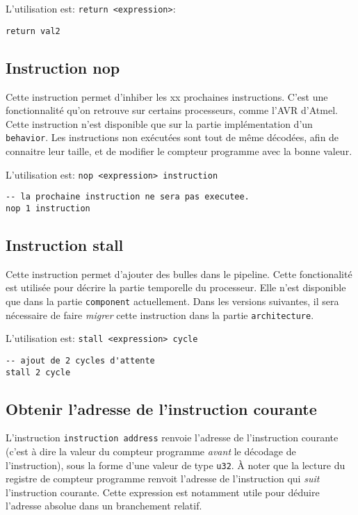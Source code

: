 L'utilisation est: \texttt{return <expression>}:
\begin{lstlisting}
return val2
\end{lstlisting}

\subsection{Instruction nop}
Cette instruction permet d'inhiber les xx prochaines instructions. C'est une fonctionnalité qu'on retrouve sur certains processeurs, comme l'AVR d'Atmel. Cette instruction n'est disponible que sur la partie implémentation d'un \texttt{behavior}. Les instructions non exécutées sont tout de même décodées, afin de connaitre leur taille, et de modifier le compteur programme avec la bonne valeur.

L'utilisation est: \texttt{nop <expression> instruction}
\begin{lstlisting}
-- la prochaine instruction ne sera pas executee.
nop 1 instruction
\end{lstlisting}

\subsection{Instruction stall}
Cette instruction permet d'ajouter des bulles dans le pipeline. Cette fonctionalité est utilisée pour décrire la partie temporelle du processeur. Elle n'est disponible que dans la partie \texttt{component} actuellement. Dans les versions suivantes, il sera nécessaire de faire \emph{migrer} cette instruction dans la partie \texttt{architecture}.

L'utilisation est: \texttt{stall <expression> cycle}
\begin{lstlisting}
-- ajout de 2 cycles d'attente
stall 2 cycle
\end{lstlisting}

\subsection{Obtenir l'adresse de l'instruction courante}
L'instruction \texttt{instruction address} renvoie l'adresse de l'instruction courante (c'est à dire la valeur du compteur programme \emph{avant} le décodage de l'instruction), sous la forme d'une valeur de type \texttt{u32}. À noter que la lecture du registre de compteur programme renvoit l'adresse de l'instruction qui \emph{suit} l'instruction courante.
Cette expression est notamment utile pour déduire l'adresse absolue dans un branchement relatif.

